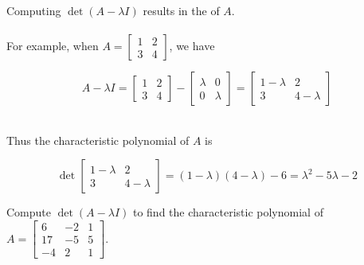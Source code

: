 \begin{applicationActivities}
\begin{definition}
Computing \(\det(A-\lambda I)\) results in the
 of \(A\). \\

\ \\

For example, when
\(A=\begin{bmatrix}1 & 2 \\ 3 & 4\end{bmatrix}\), we have

\[
  A-\lambda I=
  \begin{bmatrix}1 & 2 \\ 3 & 4\end{bmatrix}-
  \begin{bmatrix}\lambda & 0 \\ 0 & \lambda\end{bmatrix}=
  \begin{bmatrix}1-\lambda & 2 \\ 3 & 4-\lambda\end{bmatrix}
\]

\ \\
Thus the characteristic polynomial of \(A\) is

\[
  \det\begin{bmatrix}1-\lambda & 2 \\ 3 & 4-\lambda\end{bmatrix}
=
  (1-\lambda)(4-\lambda)-6
=
  \lambda^2-5\lambda-2
\]
\end{definition}

\begin{activity}{15}
  Compute $\det(A-\lambda I)$ to find the characteristic polynomial of
  $A=\begin{bmatrix} 6 & -2 & 1 \\ 17 & -5 & 5 \\ -4 & 2 & 1 \end{bmatrix}$.


\end{activity}


\end{applicationActivities}
